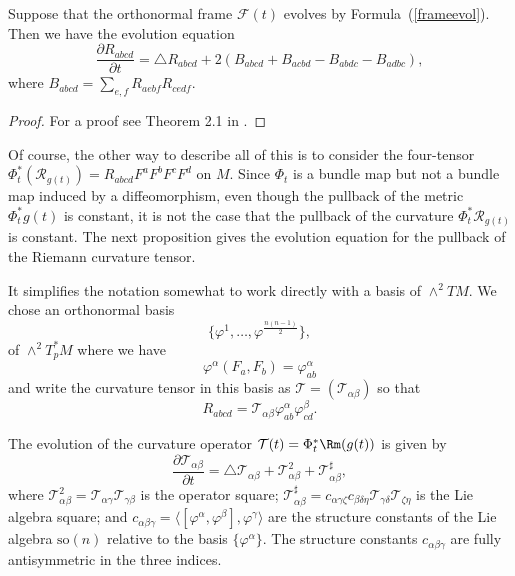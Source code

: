 \begin{lemma}\label{lem:curvature-evolution-frame}
\label{M}
Suppose that the orthonormal frame ${\mathcal F}(t)$  evolves by
Formula~(\ref{frameevol}). Then we have the evolution equation
$$\frac{\partial R_{abcd}}{\partial t} = \triangle R_{abcd} +
2(B_{abcd} +B_{acbd}-B_{abdc}-B_{adbc}),$$ where $B_{abcd} =
\sum_{e,f}R_{aebf}R_{cedf}$.
\end{lemma}


\begin{proof}
For a proof see Theorem 2.1 in \cite{Hamiltonharnack}.
\end{proof}

Of course, the other way to describe all of this  is to consider the
four-tensor $\Phi_t^*({\mathcal R}_{g(t)})=R_{abcd}F^aF^bF^cF^d$ on
$M$. Since $\Phi_t$ is a bundle map but not a bundle map induced by
a diffeomorphism, even though the pullback of the metric
$\Phi_t^*g(t)$ is constant, it is not the case that the pullback of
the curvature $\Phi_t^*{\mathcal R}_{g(t)}$ is constant.
 The next proposition gives the evolution equation for the pullback
 of the Riemann curvature tensor.



It simplifies the notation somewhat to work directly with a basis of
$\wedge^2TM$. We chose an orthonormal basis
$$\{\varphi^{1},\ldots,\varphi^{\frac{n(n-1)}{2}}\},$$
of $\wedge^2T^*_pM$ where  we have \[ \varphi^{\alpha}(F_{a},F_{b})
= \varphi^{\alpha}_{ab} \] and write the curvature tensor in this
basis as ${\mathcal T} = ({\mathcal T}_{\alpha\beta})$ so that
\begin{equation}\label{Mdefn}
R_{abcd}={\mathcal
T}_{\alpha\beta}\varphi^{\alpha}_{ab}\varphi^{\beta}_{cd}.\end{equation}


\begin{proposition}\label{prop:curvature-operator-evolution}
\label{Mevol}
The evolution of the curvature operator ${\mathcal
T}(t)=\Phi_t^*\Rm(g(t))$ is given by
\[ \frac{\partial {\mathcal T}_{\alpha\beta}}{\partial t} = \triangle
{\mathcal T}_{\alpha\beta} + {\mathcal T}^{2}_{\alpha\beta} +
{\mathcal T}^{\sharp}_{\alpha\beta},
\] where ${\mathcal T}^{2}_{\alpha\beta}={\mathcal T}_{\alpha\gamma}{\mathcal
T}_{\gamma\beta}$ is the operator square; ${\mathcal T}^{\sharp}_{\alpha\beta}
 =
c_{\alpha\gamma\zeta}c_{\beta\delta\eta}{\mathcal T}_{\gamma\delta}{\mathcal
T}_{\zeta\eta}$ is the Lie algebra square; and $c_{\alpha\beta\gamma} =
\langle[\varphi^{\alpha},\varphi^{\beta}],\varphi^{\gamma}\rangle $ are the
structure constants of the Lie algebra $\mathrm{so}(n)$ relative to the basis
$\{\varphi^{\alpha}\}$. The structure constants $c_{\alpha\beta\gamma}$  are
fully antisymmetric in the three indices.
\end{proposition}

